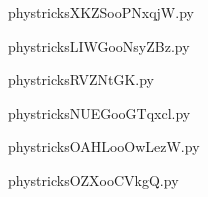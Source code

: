     \newcommand{\CaptionFigXKZSooPNxqjW}{<+Type your caption here+>}
    \begin{center}
        
    \end{center}
    phystricksXKZSooPNxqjW.py

    

    \clearpage
    


    \newcommand{\CaptionFigLIWGooNsyZBz}{<+Type your caption here+>}
    \begin{center}
        
    \end{center}
    phystricksLIWGooNsyZBz.py

    

    \clearpage
    


    \newcommand{\CaptionFigRVZNtGK}{<+Type your caption here+>}
    \begin{center}
        
    \end{center}
    phystricksRVZNtGK.py

    

    \clearpage
    


    \newcommand{\CaptionFigNUEGooGTqxcl}{<+Type your caption here+>}
    \begin{center}
        
    \end{center}
    phystricksNUEGooGTqxcl.py

    

    \clearpage
    


    \newcommand{\CaptionFigOAHLooOwLezW}{<+Type your caption here+>}
    \begin{center}
        
    \end{center}
    phystricksOAHLooOwLezW.py

    

    \clearpage
    


    \newcommand{\CaptionFigOZXooCVkgQ}{<+Type your caption here+>}
    \begin{center}
        
    \end{center}
    phystricksOZXooCVkgQ.py

